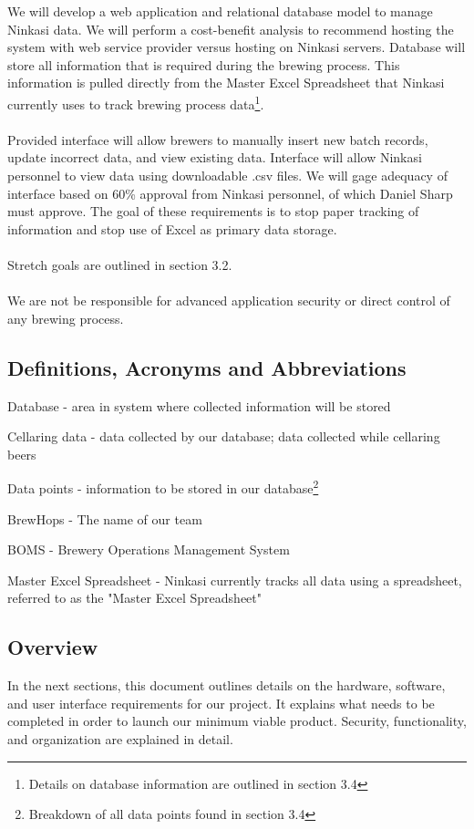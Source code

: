 \documentclass[draftclsnofoot,onecolumn,letterpaper,10pt,compsoc]{IEEEtran}
\begin{document}
		We will develop a web application and relational database model to manage Ninkasi data.
		We will perform a cost-benefit analysis to recommend hosting the system with web service provider versus hosting on Ninkasi servers.
		Database will store all information that is required during the brewing process. 
        This information is pulled directly from the Master Excel Spreadsheet that Ninkasi currently uses to track brewing process data\footnote{Details on database information are outlined in section 3.4}.
        \\
        \\
		Provided interface will allow brewers to manually insert new batch records, update incorrect data, and view existing data.
		Interface will allow Ninkasi personnel to view data using downloadable .csv files.
		We will gage adequacy of interface based on 60\% approval from Ninkasi personnel, of which Daniel Sharp must approve.
		The goal of these requirements is to stop paper tracking of information and stop use of Excel as primary data storage.
		\\
		\\
		Stretch goals are outlined in section 3.2.
		\\
		\\
		We are not be responsible for advanced application security or direct control of any brewing process.

	\subsection{Definitions, Acronyms and Abbreviations}
        Database - area in system where collected information will be stored
        
        Cellaring data - data collected by our database; data collected while cellaring beers
    
		Data points - information to be stored in our database\footnote{Breakdown of all data points found in section 3.4}

		BrewHops - The name of our team

		BOMS - Brewery Operations Management System
        
        Master Excel Spreadsheet - Ninkasi currently tracks all data using a spreadsheet, referred to as the "Master Excel Spreadsheet"

	\subsection{Overview}
		In the next sections, this document outlines details on the hardware, software, and user interface requirements for our project.
		It explains what needs to be completed in order to launch our minimum viable product.
		Security, functionality, and organization are explained in detail.
\end{document}
